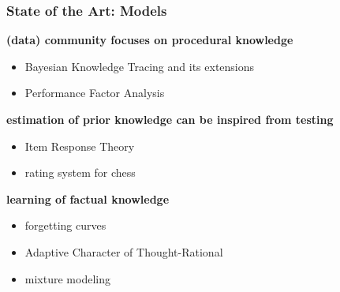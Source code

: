 \documentclass[xcolor=svgnames]{beamer}
\renewcommand{\cite}[1]{{\small\parencite{#1}}}
\begin{document}
\begin{frame}
	\frametitle{State of the Art: Models}
	\textbf{(data) community focuses on procedural knowledge}
	\begin{itemize}
		\item Bayesian Knowledge Tracing and its extensions\\\cite{van2013properties, qiu2011does}
		\item Performance Factor Analysis~\cite{pavlik2009performance}
	\end{itemize}

	\medskip
	\textbf{estimation of prior knowledge can be inspired from testing}
	\begin{itemize}
		\item Item Response Theory~\cite{rasch1993probabilistic,de2008theory}
		\item rating system for chess~\cite{elo1978rating}
	\end{itemize}

	\medskip
	\textbf{learning of factual knowledge}
	\begin{itemize}
		\item forgetting curves~\cite{ebbinghaus1885spacing}
		\item Adaptive Character of Thought-Rational\\\cite{pavlik2005practice}
		\item mixture modeling~\cite{streeter2015mixture}
	\end{itemize}
\end{frame}
\end{document}
